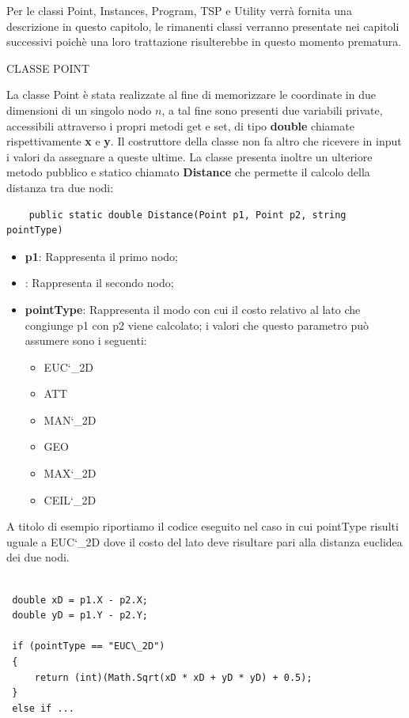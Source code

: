 \documentclass[11pt]{article}
\begin{document}
Per le classi Point, Instances, Program, TSP e Utility verrà fornita una descrizione in questo capitolo, le rimanenti classi verranno presentate nei capitoli successivi poichè una loro trattazione risulterebbe in questo momento prematura. 


\vspace{2\baselineskip}
CLASSE POINT
\vspace{2\baselineskip}

La classe Point è stata realizzate al fine di memorizzare le coordinate in due dimensioni di un singolo nodo $n$, a tal fine sono presenti due variabili private, accessibili attraverso i propri metodi get e set, di tipo \textbf{double} chiamate rispettivamente \textbf{x} e \textbf{y}. Il costruttore della classe non fa altro che ricevere in input i valori da assegnare a queste ultime. La classe presenta inoltre un ulteriore metodo pubblico e statico chiamato \textbf{Distance} che permette il calcolo della distanza tra due nodi:

\begin{lstlisting}
    public static double Distance(Point p1, Point p2, string pointType)
\end{lstlisting}

\begin{itemize}
\item \textbf{p1}: Rappresenta il primo nodo;
\item {}: Rappresenta il secondo nodo;
\item \textbf{pointType}: Rappresenta il modo con cui il costo relativo al lato che congiunge p1 con p2 viene calcolato; i valori che questo parametro può assumere sono i seguenti:
    \begin{itemize}
    \item EUC\char`\_2D
    \item ATT
    \item MAN\char`\_2D
    \item GEO
    \item MAX\char`\_2D    
    \item CEIL\char`\_2D
    \end{itemize}
\end{itemize}

A titolo di esempio riportiamo il codice eseguito nel caso in cui pointType risulti uguale a EUC\char`\_2D dove il costo del lato deve risultare pari alla distanza euclidea dei due nodi. 

\begin{lstlisting}

 double xD = p1.X - p2.X;
 double yD = p1.Y - p2.Y;
 
 if (pointType == "EUC\_2D")
 {
     return (int)(Math.Sqrt(xD * xD + yD * yD) + 0.5);
 }
 else if ...
            
\end{lstlisting}
\end{document}
